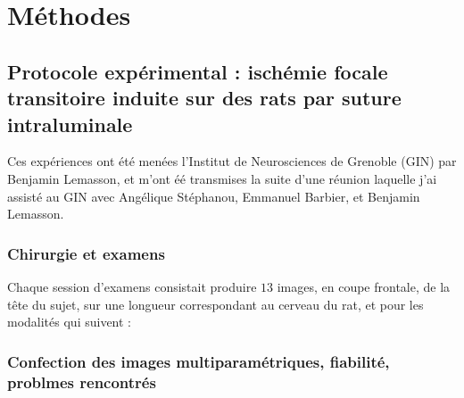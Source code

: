 \section{M\'ethodes}

\makeatletter
\renewcommand{\thefigure}{\ifnum \c@section>\z@ \thesection.\fi
 \@arabic\c@figure}
\makeatother
\begin{comment}
Remarque : pour renuméroter les sous-figures de la même manière
           (avec le package 'subfigure'), il suffit de rajouter
	   la ligne \let\p@subfigure\thefigure dans le préambule.
\end{comment}

\subsection{Protocole exp\'erimental : isch\'emie focale transitoire induite sur des rats par suture intraluminale}

Ces exp\'eriences ont \'et\'e men\'ees  l'Institut de Neurosciences de Grenoble (GIN) par Benjamin Lemasson, %
et m'ont \'e\'e transmises  la suite d'une r\'eunion  laquelle j'ai assist\'e au GIN %
avec Ang\'elique St\'ephanou, Emmanuel Barbier, et Benjamin Lemasson.

\cite{Lem_PHD_10}

\subsubsection{Chirurgie et examens}



Chaque session d'examens consistait  produire $13$ images, en coupe frontale, de la t\^ete du sujet, %
sur une longueur correspondant au cerveau du rat, et pour les modalit\'es qui suivent :

\subsubsection{Confection des images multiparam\'etriques, fiabilit\'e, problmes rencontr\'es}





